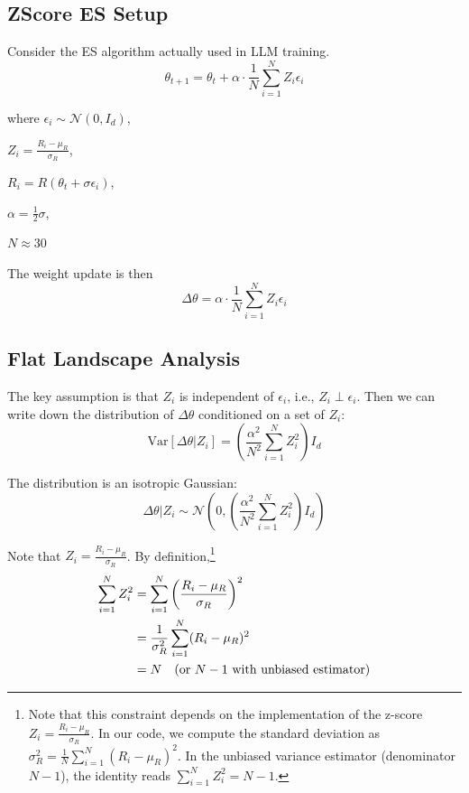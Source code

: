     
    \subsection{ZScore ES Setup}
    Consider the ES algorithm actually used in LLM training.
    \begin{equation}
    \theta_{t+1} = \theta_{t} + \alpha \cdot \frac{1}{N} \sum_{i=1}^{N} Z_{i}\epsilon_{i}
    \end{equation}
    
    where $\epsilon_{i}\sim\mathcal{N}(0,I_{d})$,
    
    $Z_{i} = \frac{R_{i}-\mu_{R}}{\sigma_{R}}$,
    
    $R_{i} = R(\theta_{t}+\sigma\epsilon_{i})$,
    
    $\alpha = \frac{1}{2}\sigma$,
    
    $N \approx 30$
    
    The weight update is then
    \begin{equation}
    \Delta\theta = \alpha \cdot \frac{1}{N} \sum_{i=1}^{N} Z_{i}\epsilon_{i}
    \end{equation}
    
    \subsection{Flat Landscape Analysis}\label{appsec:flat_RW_scaling}
    
    The key assumption is that $Z_{i}$ is independent of $\epsilon_{i}$,
    i.e., $Z_{i}\perp\epsilon_{i}$. Then we can write down the distribution
    of $\Delta\theta$ conditioned on a set of $Z_{i}$:
    \begin{equation}
    \mathrm{Var}[\Delta\theta|Z_{i}] = \left(\frac{\alpha^{2}}{N^{2}}\sum_{i=1}^{N}Z_{i}^{2}\right)I_{d}
    \end{equation}
    
    The distribution is an isotropic Gaussian:
    \begin{equation}
    \Delta\theta|Z_{i} \sim \mathcal{N}\left(0, \left(\frac{\alpha^{2}}{N^{2}}\sum_{i=1}^{N}Z_{i}^{2}\right)I_{d}\right)
    \end{equation}
    
    Note that $Z_{i} = \frac{R_{i} - \mu_{R}}{\sigma_{R}}$. By definition,\footnote{Note that this constraint depends on the implementation of the z-score
    $Z_{i} = \frac{R_{i}-\mu_{R}}{\sigma_{R}}$. In our code, we compute
    the standard deviation as $\sigma_{R}^{2} = \frac{1}{N}\sum_{i=1}^{N}(R_{i}-\mu_{R})^{2}$.
    In the unbiased variance estimator (denominator $N-1$), the identity reads $\sum_{i=1}^{N}Z_{i}^{2} = N-1$.}
    \begin{align}
    \sum_{i=1}^{N}Z_{i}^{2}
    &= \sum_{i=1}^{N} \left(\frac{R_{i}-\mu_{R}}{\sigma_{R}}\right)^{2} \notag\\
    &= \frac{1}{\sigma_{R}^{2}}\sum_{i=1}^{N}(R_{i} - \mu_{R})^{2} \notag\\
    &= N\quad\text{(or $N-1$ with unbiased estimator)}
    \end{align}
    
